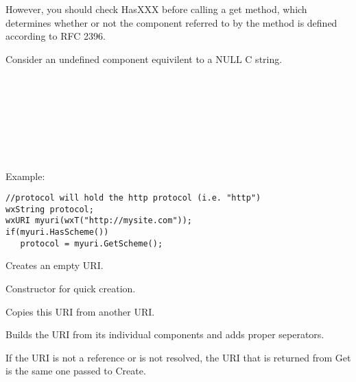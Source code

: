 However, you should check HasXXX before
calling a get method, which determines whether or not the component referred
to by the method is defined according to RFC 2396.

Consider an undefined component equivilent to a 
NULL C string.\\
\\ 
\\
\\
\\
\\
\\
\\

Example:
\begin{verbatim}
//protocol will hold the http protocol (i.e. "http")
wxString protocol;
wxURI myuri(wxT("http://mysite.com"));
if(myuri.HasScheme())
   protocol = myuri.GetScheme();
\end{verbatim}

\label{wxuriwxuri}


Creates an empty URI.


Constructor for quick creation.



Copies this URI from another URI.



\label{wxuribuilduri}


Builds the URI from its individual components and adds proper seperators.

If the URI is not a reference or is not resolved, 
the URI that is returned from Get is the same one 
passed to Create.


\label{wxuribuildunescapeduri}


